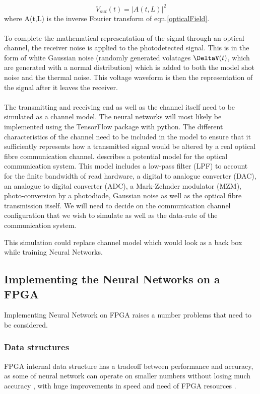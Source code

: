\begin{equation}
    V_{out}(t) = |A(t,L)|^2
\end{equation}
    where A(t,L) is the inverse Fourier transform of eqn.\ref{opticalField}.
\\
\\
To complete the mathematical representation of the signal through an optical channel, the receiver noise is applied to the photodetected signal. This is in the form of white Gaussian noise (randomly generated volatages $\DeltaV(t)$, which are generated with a normal distribution) which is added to both the model shot noise and the thermal noise. This voltage waveform is then the representation of the signal after it leaves the receiver.
\\
\\
The transmitting and receiving end as well as the channel itself need to be simulated as a channel model. The neural networks will most likely be implemented using the TensorFlow package with python. The different characteristics of the channel need to be included in the model to ensure that it sufficiently represents how a transmitted signal would be altered by a real optical fibre communication channel. \autocite{8433895} describes a potential model for the optical communication system. This model includes a low-pass filter (LPF) to account for the finite bandwidth of read hardware, a digital to analogue converter (DAC), an analogue to digital converter (ADC), a Mark-Zehnder modulator (MZM), photo-conversion by a photodiode, Gaussian noise as well as the optical fibre transmission itself. We will need to decide on the communication channel configuration that we wish to simulate as well as the data-rate of the communication system. 

This simulation could replace channel model which would look as a back box while training Neural Networks.

\subsection{Implementing the Neural Networks on a FPGA}

Implementing Neural Network on FPGA raises a number problems that need to be considered.
 
\subsubsection{Data structures}
FPGA internal data structure has a tradeoff between performance and accuracy, as some of neural network can operate on smaller numbers without losing much accuracy \autocite{8330546}, with huge improvements in speed and need of FPGA resources \autocite{omondi_rajapakse_2006}. 


